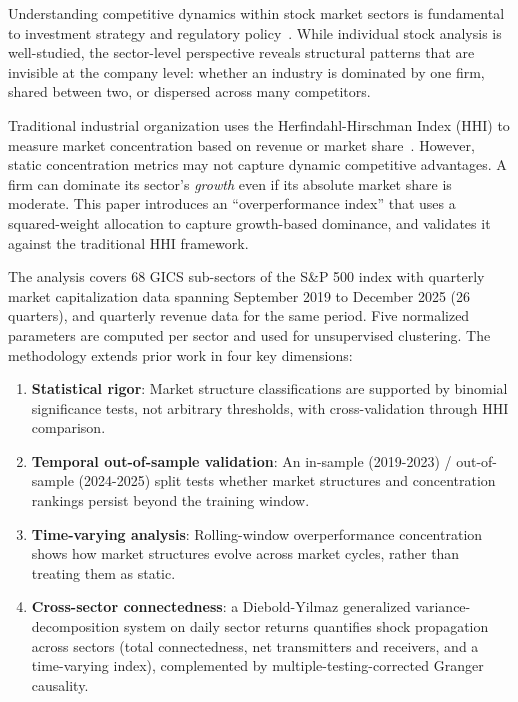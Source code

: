 \documentclass[11pt]{article}
\begin{document}
Understanding competitive dynamics within stock market sectors is fundamental to investment strategy and regulatory policy~\cite{fama1970, bali2016}. While individual stock analysis is well-studied, the sector-level perspective reveals structural patterns that are invisible at the company level: whether an industry is dominated by one firm, shared between two, or dispersed across many competitors.

Traditional industrial organization uses the Herfindahl-Hirschman Index (HHI) to measure market concentration based on revenue or market share~\cite{rhoades1993}. However, static concentration metrics may not capture dynamic competitive advantages. A firm can dominate its sector's \textit{growth} even if its absolute market share is moderate. This paper introduces an ``overperformance index'' that uses a squared-weight allocation to capture growth-based dominance, and validates it against the traditional HHI framework.

The analysis covers 68 GICS sub-sectors of the S\&P 500 index with quarterly market capitalization data spanning September 2019 to December 2025 (26 quarters), and quarterly revenue data for the same period. Five normalized parameters are computed per sector and used for unsupervised clustering. The methodology extends prior work in four key dimensions:

\begin{enumerate}
    \item \textbf{Statistical rigor}: Market structure classifications are supported by binomial significance tests, not arbitrary thresholds, with cross-validation through HHI comparison.
    \item \textbf{Temporal out-of-sample validation}: An in-sample (2019-2023) / out-of-sample (2024-2025) split tests whether market structures and concentration rankings persist beyond the training window.
    \item \textbf{Time-varying analysis}: Rolling-window overperformance concentration shows how market structures evolve across market cycles, rather than treating them as static.
    \item \textbf{Cross-sector connectedness}: a Diebold-Yilmaz generalized variance-decomposition system on daily sector returns quantifies shock propagation across sectors (total connectedness, net transmitters and receivers, and a time-varying index), complemented by multiple-testing-corrected Granger causality.
\end{enumerate}
\end{document}
